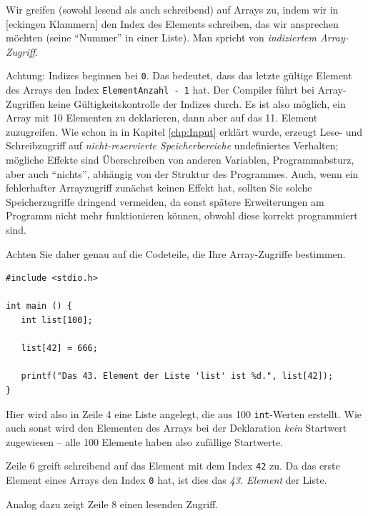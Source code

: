 Wir greifen (sowohl lesend als auch schreibend) auf Arrays zu, indem wir in [eckingen Klammern] den Index des Elements schreiben, das wir ansprechen möchten (\ie seine \enquote{Nummer} in einer Liste). Man spricht von \emph{indiziertem Array-Zugriff}.

\begin{warnbox}[Indizierung ab 0]
Achtung: Indizes beginnen bei \texttt{0}. Das bedeutet, dass das letzte gültige Element des Arrays den Index \texttt{ElementAnzahl - 1} hat. Der Compiler führt bei Array-Zugriffen keine Gültigkeitskontrolle der Indizes durch. Es ist also möglich, ein Array mit 10 Elementen zu deklarieren, dann aber auf das 11. Element zuzugreifen. Wie schon in in Kapitel \ref{chp:Input} erklärt wurde, erzeugt Lese- und Schreibzugriff auf \emph{nicht-reservierte Speicherbereiche} undefiniertes Verhalten; mögliche Effekte sind Überschreiben von anderen Variablen, Programmabsturz, aber auch \enquote{nichts}, abhängig von der Struktur des Programmes. Auch, wenn ein fehlerhafter Arrayzugriff zunächst keinen Effekt hat, sollten Sie solche Speicherzugriffe dringend vermeiden, da sonst spätere Erweiterungen am Programm nicht mehr funktionieren können, obwohl diese korrekt programmiert sind.

Achten Sie daher genau auf die Codeteile, die Ihre Array-Zugriffe bestimmen.
\end{warnbox}

\begin{codebox}
\begin{verbatim}
#include <stdio.h>

int main () {
   int list[100];
   
   list[42] = 666;
   
   printf("Das 43. Element der Liste 'list' ist %d.", list[42]);
}
\end{verbatim}
\end{codebox}

Hier wird also in Zeile 4 eine Liste angelegt, die aus 100 \texttt{int}-Werten erstellt. Wie auch sonst wird den Elementen des Arrays bei der Deklaration \emph{kein} Startwert zugewiesen -- alle 100 Elemente haben also zufällige Startwerte.

Zeile 6 greift schreibend auf das Element mit dem Index \texttt{42} zu. Da das erste Element eines Arrays den Index \texttt{0} hat, ist dies das \emph{43. Element} der Liste.

Analog dazu zeigt Zeile 8 einen lesenden Zugriff.

